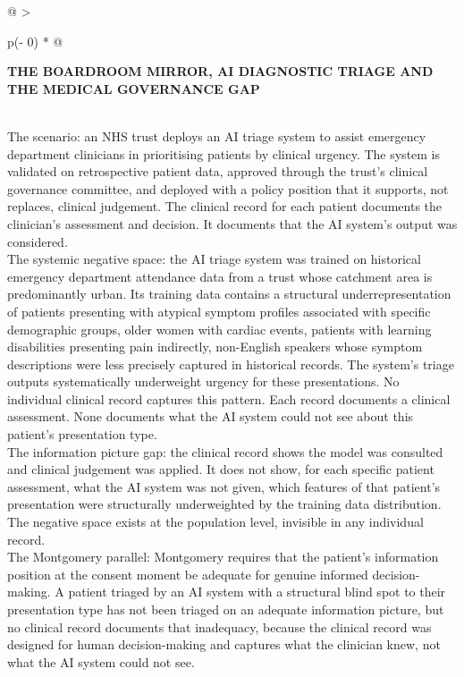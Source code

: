 \begin{longtable}[]{@{}
  >{\raggedright\arraybackslash}p{(\columnwidth - 0\tabcolsep) * }@{}}
\toprule\noalign{}
\begin{minipage}[b]{\linewidth}\raggedright
\textbf{THE BOARDROOM MIRROR, AI DIAGNOSTIC TRIAGE AND THE MEDICAL GOVERNANCE GAP}
\end{minipage} \\
\midrule\noalign{}
\endhead
\bottomrule\noalign{}
\endlastfoot
The scenario: an NHS trust deploys an AI triage system to assist emergency department clinicians in prioritising patients by clinical urgency. The system is validated on retrospective patient data, approved through the trust's clinical governance committee, and deployed with a policy position that it supports, not replaces, clinical judgement. The clinical record for each patient documents the clinician's assessment and decision. It documents that the AI system's output was considered. \\
The systemic negative space: the AI triage system was trained on historical emergency department attendance data from a trust whose catchment area is predominantly urban. Its training data contains a structural underrepresentation of patients presenting with atypical symptom profiles associated with specific demographic groups, older women with cardiac events, patients with learning disabilities presenting pain indirectly, non-English speakers whose symptom descriptions were less precisely captured in historical records. The system's triage outputs systematically underweight urgency for these presentations. No individual clinical record captures this pattern. Each record documents a clinical assessment. None documents what the AI system could not see about this patient's presentation type. \\
The information picture gap: the clinical record shows the model was consulted and clinical judgement was applied. It does not show, for each specific patient assessment, what the AI system was not given, which features of that patient's presentation were structurally underweighted by the training data distribution. The negative space exists at the population level, invisible in any individual record. \\
The Montgomery parallel: Montgomery requires that the patient's information position at the consent moment be adequate for genuine informed decision-making. A patient triaged by an AI system with a structural blind spot to their presentation type has not been triaged on an adequate information picture, but no clinical record documents that inadequacy, because the clinical record was designed for human decision-making and captures what the clinician knew, not what the AI system could not see. \\

\end{longtable}
